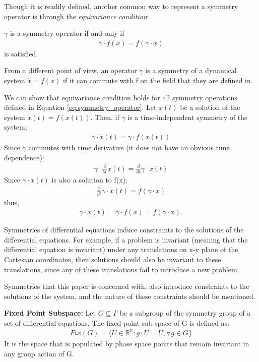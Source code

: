 Though it is readily defined, another common way to represent a symmetry operator is through the \emph{equivariance condition}:
\begin{proposition}
\label{prop:equivariance_cond}
$\gamma $ is a symmetry operator if and only if 
\begin{align}
 \gamma \cdot f(x) = f(\gamma \cdot x)
 \end{align}
is satisfied. 
\end{proposition}
From a different point of view, an operator $\gamma$ is a symmetry of a dynamical system $\dot{x} = f(x)$ if it can commute with f  on the field that they are defined in.

We can show that equivariance condition holds for all symmetry operations defined in Equation \ref{eq:symmetry_operator}.
Let $x(t)$ be a solution of the system $\dot{x}(t) = f(x(t))$. Then, if $\gamma$ is a time-independent symmetry of the system,
\begin{align}
\gamma \cdot \dot{x}(t) = \gamma \cdot f(x(t))
\end{align}
Since $\gamma$ commutes with time derivative (it does not have an obvious time dependence):
\begin{align} 
\gamma \cdot \frac{\partial}{\partial t} x(t) = \frac{\partial}{\partial t}\gamma \cdot x(t)  
\end{align}
Since $\gamma \cdot x(t)$ is also a solution to f(x):
\begin{align}
\frac{\partial}{\partial t}\gamma \cdot x(t) = f(\gamma \cdot x)
\end{align}
thus,
\begin{align}
\gamma \cdot \dot{x}(t) = \gamma \cdot f(x) = f(\gamma \cdot x).
\end{align}

Symmetries of differential equations induce constraints to the solutions of the differential equations. For example, if a problem is invariant (meaning that the differential equation is invariant) under any translations on x-y plane of the Cartesian coordinates, then solutions should also be invariant to these translations, since any of these translations fail to introduce a new problem.

Symmetries that this paper is concerned with, also introduce constraints to the solutions of the system, and the nature of these constraints should be mentioned.

\begin{definition}
\label{def:fixed_pt_subspace}
\textbf{Fixed Point Subspace:}
Let $G \subseteq \Gamma$ be a subgroup of the symmetry group of a set of differential equations. The fixed point sub space of G is defined as:
 \begin{align}
Fix(G) = \{U \in \mathbb{R}^n : g \cdot U  = U , \forall g \in G\} 
 \end{align}
 It is the space that is populated by phase space points that remain invariant in any group action of G.
\end{definition}

